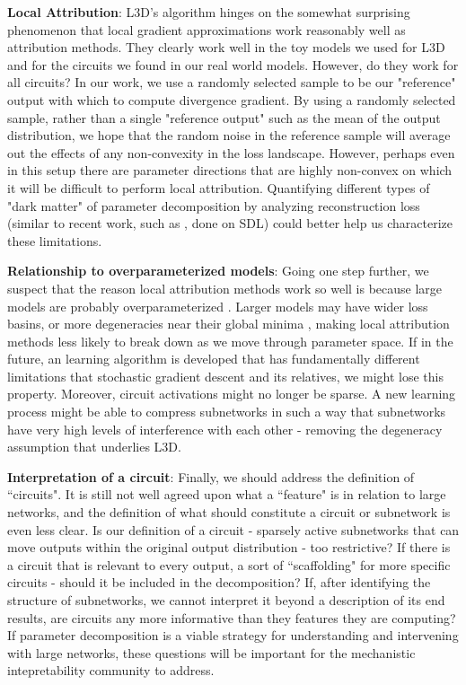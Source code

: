 \documentclass{article}
\theoremstyle{plain}
\theoremstyle{definition}
\theoremstyle{remark}
\begin{document}
\textbf{Local Attribution}: L3D's algorithm hinges on the somewhat surprising phenomenon that local gradient approximations work reasonably well as attribution methods. They clearly work well in the toy models we used for L3D and for the circuits we found in our real world models. However, do they work for all circuits? In our work, we use a randomly selected sample to be our "reference" output with which to compute divergence gradient. By using a randomly selected sample, rather than a single "reference output" such as the mean of the output distribution, we hope that the random noise in the reference sample will average out the effects of any non-convexity in the loss landscape.  However, perhaps even in this setup there are parameter directions that are highly non-convex on which it will be difficult to perform local attribution. Quantifying different types of "dark matter" of parameter decomposition by analyzing reconstruction loss (similar to recent work, such as \cite{engels2024decomposing}, done on SDL) could better help us characterize these limitations.

\textbf{Relationship to overparameterized models}: Going one step further, we suspect that the reason local attribution methods work so well is because large models are probably overparameterized \cite{kawaguchi2016deep,choromanska2015loss,dauphin2014identifying,soudry2017exponentially}. Larger models may have wider loss basins, or more degeneracies near their global minima \cite{keskar2016large,sagun2017empirical}, making local attribution methods less likely to break down as we move through parameter space. If in the future, an learning algorithm is developed that has fundamentally different limitations that stochastic gradient descent and its relatives, we might lose this property. Moreover, circuit activations might no longer be sparse. A new learning process might be able to compress subnetworks in such a way that subnetworks have very high levels of interference with each other - removing the degeneracy assumption that underlies L3D. 

\textbf{Interpretation of a circuit}: Finally, we should address the definition of ``circuits". It is still not well agreed upon what a ``feature" is in relation to large networks, and the definition of what should constitute a circuit or subnetwork is even less clear. Is our definition of a circuit - sparsely active subnetworks that can move outputs within the original output distribution - too restrictive? If there is a circuit that is relevant to every output, a sort of ``scaffolding" for more specific circuits - should it be included in the decomposition? If, after identifying the structure of subnetworks, we cannot interpret it beyond a description of its end results, are circuits any more informative than they features they are computing? If parameter decomposition is a viable strategy for understanding and intervening with large networks, these questions will be important for the mechanistic intepretability community to address.
\end{document}
